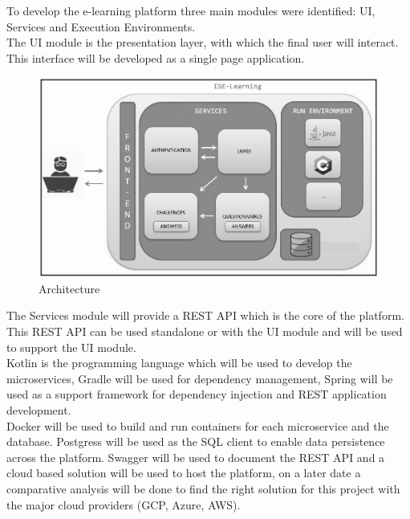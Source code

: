 To develop the e-learning platform three main modules were identified: UI, Services and Execution Environments.
\\
The UI module is the presentation layer, with which the final user will interact. This interface will be developed as a single page application.\cite[p. 2] {ref2}
\\
	\begin{figure}
  		\includegraphics[scale=0.6]{./imgs/arquitecturaV2.JPG}
  		\caption{Architecture}
  		\label{fig:architecture}
	\end{figure} 
The Services module will provide a REST API which is the core of the platform.
\\
This REST API can be used standalone or with the UI module and will be used to support the UI module. 
\iffalse
\\
Kotlin is the programming language which will be used to develop the microservices, Gradle will be used for dependency management, Spring will be used as a support framework for dependency injection and REST application development.
\\
Docker will be used to build and run containers for each microservice and the database. Postgress will be used as the SQL client to enable data persistence across the platform. Swagger will be used to document the REST API and a cloud based solution will be used to host the platform, on a later date a comparative analysis will be done to find the right solution for this project with the major cloud providers (GCP, Azure, AWS).
\\
